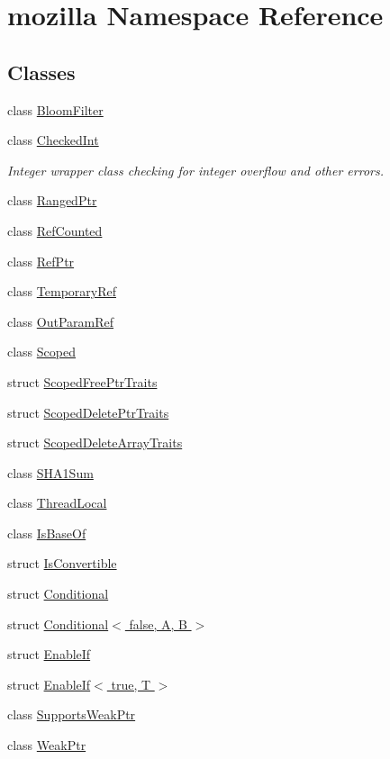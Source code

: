 \hypertarget{namespacemozilla}{\section{mozilla Namespace Reference}
\label{namespacemozilla}
}
\subsection*{Classes}
\begin{DoxyCompactItemize}
\item 
class \hyperlink{classmozilla_1_1_bloom_filter}{Bloom\-Filter}
\item 
class \hyperlink{classmozilla_1_1_checked_int}{Checked\-Int}
\begin{DoxyCompactList}\small\item\em Integer wrapper class checking for integer overflow and other errors. \end{DoxyCompactList}\item 
class \hyperlink{classmozilla_1_1_ranged_ptr}{Ranged\-Ptr}
\item 
class \hyperlink{classmozilla_1_1_ref_counted}{Ref\-Counted}
\item 
class \hyperlink{classmozilla_1_1_ref_ptr}{Ref\-Ptr}
\item 
class \hyperlink{classmozilla_1_1_temporary_ref}{Temporary\-Ref}
\item 
class \hyperlink{classmozilla_1_1_out_param_ref}{Out\-Param\-Ref}
\item 
class \hyperlink{classmozilla_1_1_scoped}{Scoped}
\item 
struct \hyperlink{structmozilla_1_1_scoped_free_ptr_traits}{Scoped\-Free\-Ptr\-Traits}
\item 
struct \hyperlink{structmozilla_1_1_scoped_delete_ptr_traits}{Scoped\-Delete\-Ptr\-Traits}
\item 
struct \hyperlink{structmozilla_1_1_scoped_delete_array_traits}{Scoped\-Delete\-Array\-Traits}
\item 
class \hyperlink{classmozilla_1_1_s_h_a1_sum}{S\-H\-A1\-Sum}
\item 
class \hyperlink{classmozilla_1_1_thread_local}{Thread\-Local}
\item 
class \hyperlink{classmozilla_1_1_is_base_of}{Is\-Base\-Of}
\item 
struct \hyperlink{structmozilla_1_1_is_convertible}{Is\-Convertible}
\item 
struct \hyperlink{structmozilla_1_1_conditional}{Conditional}
\item 
struct \hyperlink{structmozilla_1_1_conditional_3_01false_00_01_a_00_01_b_01_4}{Conditional$<$ false, A, B $>$}
\item 
struct \hyperlink{structmozilla_1_1_enable_if}{Enable\-If}
\item 
struct \hyperlink{structmozilla_1_1_enable_if_3_01true_00_01_t_01_4}{Enable\-If$<$ true, T $>$}
\item 
class \hyperlink{classmozilla_1_1_supports_weak_ptr}{Supports\-Weak\-Ptr}
\item 
class \hyperlink{classmozilla_1_1_weak_ptr}{Weak\-Ptr}
\end{DoxyCompactItemize}

